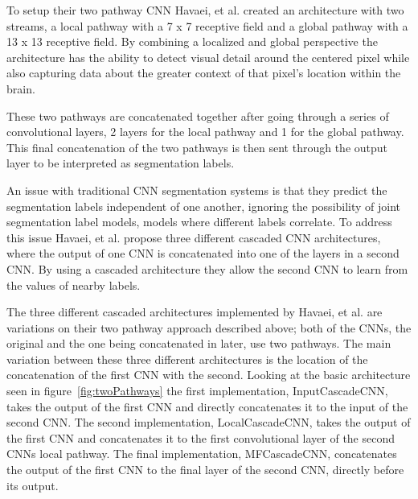 \documentclass{sig-alternate}
\begin{document}
To setup their two pathway CNN Havaei, et al. created an architecture with two streams, a local pathway with a 7 x 7 receptive field and a global pathway with a 13 x 13 receptive field. By combining a localized and global perspective the architecture has the ability to detect visual detail around the centered pixel while also capturing data about the greater context of that pixel's location within the brain.

These two pathways are concatenated together after going through a series of convolutional layers, 2 layers for the local pathway and 1 for the global pathway. This final concatenation of the two pathways is then sent through the output layer to be interpreted as segmentation labels.

An issue with traditional CNN segmentation systems is that they predict the segmentation labels independent of one another, ignoring the possibility of joint segmentation label models, models where different labels correlate. To address this issue Havaei, et al. propose three different cascaded CNN architectures, where the output of one CNN is concatenated into one of the layers in a second CNN. By using a cascaded architecture they allow the second CNN to learn from the values of nearby labels.

\begin{figure*}
\centering
{}
\caption{The base two-pathway architedcture used by Havaei, et al. ~\cite{Havaei:2017}}
\label{fig:twoPathways}
\end{figure*}

The three different cascaded architectures implemented by Havaei, et al. are variations on their two pathway approach described above; both of the CNNs, the original and the one being concatenated in later, use two pathways. The main variation between these three different architectures is the location of the concatenation of the first CNN with the second. Looking at the basic architecture seen in figure~\ref{fig:twoPathways} the first implementation, InputCascadeCNN, takes the output of the first CNN and directly concatenates it to the input of the second CNN. The second implementation, LocalCascadeCNN, takes the output of the first CNN and concatenates it to the first convolutional layer of the second CNNs local pathway. The final implementation, MFCascadeCNN, concatenates the output of the first CNN to the final layer of the second CNN, directly before its output.
\end{document}
